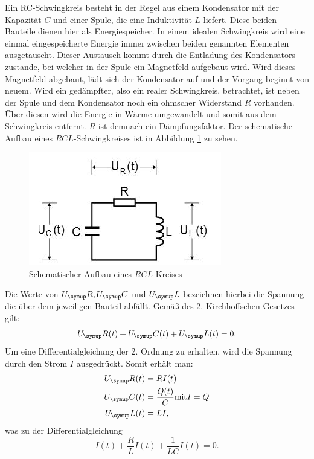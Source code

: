 Ein RC-Schwingkreis besteht in der Regel aus einem Kondensator mit der
Kapazität $C$ und einer Spule, die eine Induktivität $L$ liefert.
Diese beiden Bauteile dienen hier als Energiespeicher.
In einem idealen Schwingkreis wird eine einmal eingespeicherte Energie
immer zwischen beiden genannten Elementen ausgetauscht.
Dieser Austausch kommt durch die Entladung des Kondensators zustande, bei welcher
in der Spule ein Magnetfeld aufgebaut wird. Wird dieses Magnetfeld abgebaut,
lädt sich der Kondensator auf und der Vorgang beginnt von neuem.
Wird ein gedämpfter, also ein realer Schwingkreis, betrachtet, ist neben der
Spule und dem Kondensator noch ein ohmscher Widerstand $R$ vorhanden.
Über diesen wird die Energie in Wärme umgewandelt und somit aus dem
Schwingkreis entfernt. $R$ ist demnach ein Dämpfungsfaktor.
Der schematische Aufbau eines $RCL$-Schwingkreises ist in Abbildung \ref{fig:rcl}
zu sehen.
\begin{figure}[H]
  \centering
  \includegraphics{Bilder/RCL.JPG}
  \caption{Schematischer Aufbau eines $RCL$-Kreises\cite{354}}
  \label{fig:rcl}
\end{figure}
Die Werte von $U_\su{R}, U_\su{C}$ und $U_\su{L}$ bezeichnen hierbei die Spannung
die über dem jeweiligen Bauteil abfällt. Gemäß des 2. Kirchhoffschen Gesetzes
gilt:
\begin{equation}
  U_\su{R}(t) + U_\su{C}(t) + U_\su{L}(t) = 0.
  \label{eqn:kirch}
\end{equation}
Um eine Differentialgleichung der 2. Ordnung zu erhalten, wird die Spannung
durch den Strom $I$ ausgedrückt. Somit erhält man:
\begin{align*}
  U_\su{R}(t) &= RI(t) \\
  U_\su{C}(t) &= \frac{Q(t)}{C} \hfill\text{mit}\hfill I = Q \\
  U_\su{L}(t) &= LI ,
\end{align*}
was zu der Differentialgleichung
\begin{equation}
  I(t) + \frac{R}{L}I(t) + \frac{1}{LC} I(t) = 0 .
\end{equation}
